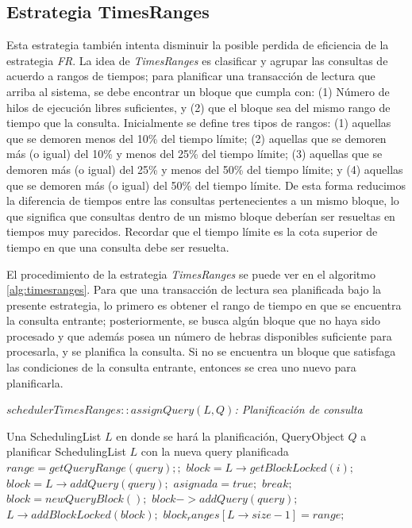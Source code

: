\subsection{Estrategia TimesRanges}
\label{scheduling:timesranges}
Esta estrategia también intenta disminuir la posible perdida de eficiencia de la estrategia \textit{FR}. La idea de \textit{TimesRanges} es clasificar y agrupar las consultas de acuerdo a rangos de tiempos; para planificar una transacción de lectura que arriba al sistema, se debe encontrar un bloque que cumpla con: (1) Número de hilos de ejecución libres suficientes, y (2) que el bloque sea del mismo rango de tiempo que la consulta. Inicialmente se define tres tipos de rangos: (1) aquellas que se demoren menos del 10\% del tiempo límite; (2) aquellas que se demoren más (o igual) del 10\% y menos del 25\% del tiempo límite; (3) aquellas que se demoren más (o igual) del 25\% y menos del 50\% del tiempo límite; y (4) aquellas que se demoren más (o igual) del 50\% del tiempo límite. De esta forma reducimos la diferencia de tiempos entre las consultas pertenecientes a un mismo bloque, lo que significa que consultas dentro de un mismo bloque deberían ser resueltas en tiempos muy parecidos. Recordar que el tiempo límite es la cota superior de tiempo en que una consulta debe ser resuelta.

El procedimiento de la estrategia \textit{TimesRanges} se puede ver en el algoritmo \ref{alg:timesranges}. Para que una transacción de lectura sea planificada bajo la presente estrategia, lo primero es obtener el rango de tiempo en que se encuentra la consulta entrante; posteriormente, se busca algún bloque que no haya sido procesado y que además posea un número de hebras disponibles suficiente para procesarla, y se planifica la consulta. Si no se encuentra un bloque que satisfaga las condiciones de la consulta entrante, entonces se crea uno nuevo para planificarla. 

\begin{algorithm}[!th]
\caption{\em $schedulerTimesRanges::assignQuery(L, Q)$: Planificación de consulta}
\label{alg:timesranges}
\begin{algorithmic}[1]
\REQUIRE Una SchedulingList $L$ en donde se hará la planificación, QueryObject $Q$ a planificar
\ENSURE SchedulingList $L$ con la nueva query planificada	
	\STATE $range = getQueryRange(query);;$		
		\STATE $block = L \rightarrow getBlockLocked(i);$	
			\STATE $block = L \rightarrow addQuery(query);$
			\STATE $asignada = true;$
			\STATE $break;$	
		\ENDIF
	\ENDFOR
		\STATE $block = new QueryBlock();$	
		\STATE $block->addQuery(query);$	
		\STATE $L \rightarrow addBlockLocked(block);$
		\STATE $block_ranges[L \rightarrow size - 1] = range;$	
	\ENDIF
\end{algorithmic}
\end{algorithm}


